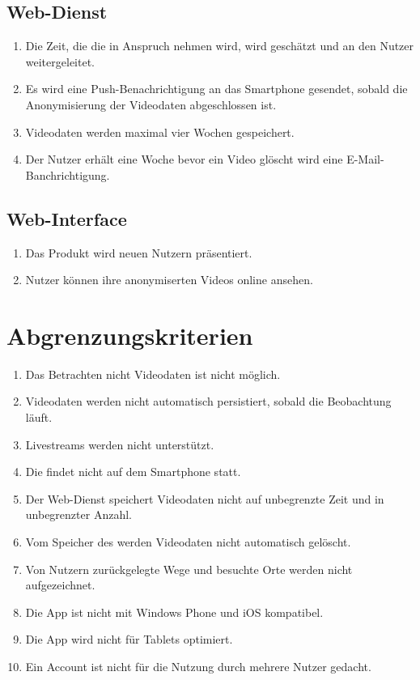 \subsection{Web-Dienst}
	\begin{enumerate}
	\renewcommand{\labelenumi}{\textbf{\theenumi}}
	\renewcommand{\theenumi}{WK\arabic{enumi}0}
	\setcounter{enumi}{199}
	\item Die Zeit, die die  in Anspruch nehmen wird, wird geschätzt und an den Nutzer weitergeleitet.
	\item Es wird eine \gls{Push-Benachrichtigung} an das \gls{Smartphone} gesendet, sobald die Anonymisierung der Videodaten abgeschlossen ist.
	\item Videodaten werden maximal vier Wochen gespeichert.
	\item Der Nutzer erhält eine Woche bevor ein Video glöscht wird eine \gls{E-Mail}-Banchrichtigung.
	\end{enumerate}
\subsection{Web-Interface}
	\begin{enumerate}
	\renewcommand{\labelenumi}{\textbf{\theenumi}}
	\renewcommand{\theenumi}{WK\arabic{enumi}0}
	\setcounter{enumi}{299}
	\item Das Produkt wird neuen Nutzern präsentiert.
	\item Nutzer können ihre anonymiserten Videos online ansehen.
	\end{enumerate}

\section{Abgrenzungskriterien}
	\begin{enumerate}
	\renewcommand{\labelenumi}{\textbf{\theenumi}}
	\renewcommand{\theenumi}{AK\arabic{enumi}0}
	\setcounter{enumi}{99}
	\item Das Betrachten nicht  Videodaten ist nicht möglich.
	\item Videodaten werden nicht automatisch persistiert, sobald die Beobachtung läuft.
	\item \glspl{Livestream} werden nicht unterstützt.
	\item Die  findet nicht auf dem \gls{Smartphone} statt.
	\item Der \gls{Web-Dienst} speichert Videodaten nicht auf unbegrenzte Zeit und in unbegrenzter Anzahl.
	\item Vom Speicher des  werden Videodaten nicht automatisch gelöscht.
	\item Von Nutzern zurückgelegte Wege und besuchte Orte werden nicht aufgezeichnet.
	\item Die \gls{App} ist nicht mit \gls{Windows Phone} und \gls{iOS} kompatibel.
	\item Die \gls{App} wird nicht für \glspl{Tablet} optimiert.
	\item Ein Account ist nicht für die Nutzung durch mehrere Nutzer gedacht.
	\end{enumerate}
